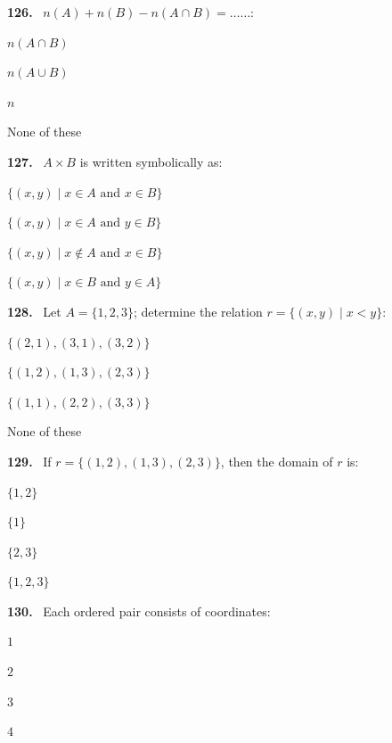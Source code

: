 \documentclass[11pt]{article}
\newenvironment{qenv}[1]{%
  \par\medskip\noindent\textbf{#1.}\ \ignorespaces
}{\par}
\begin{document}
\begin{qenv}{126} $n(A)+n(B)-n(A\cap B) = \ldots\ldots$:
\begin{options} \item $n(A\cap B)$ \item $n(A\cup B)$ \item $n$ \item None of these \end{options} \end{qenv}

\begin{qenv}{127} $A\times B$ is written symbolically as:
\begin{options} \item $\{(x,y)\mid x\in A \text{ and } x\in B\}$ \item $\{(x,y)\mid x\in A \text{ and } y\in B\}$ \item $\{(x,y)\mid x\notin A \text{ and } x\in B\}$ \item $\{(x,y)\mid x\in B \text{ and } y\in A\}$ \end{options} \end{qenv}

\begin{qenv}{128} Let $A=\{1,2,3\}$; determine the relation $r=\{(x,y)\mid x<y\}$:
\begin{options} \item $\{(2,1),(3,1),(3,2)\}$ \item $\{(1,2),(1,3),(2,3)\}$ \item $\{(1,1),(2,2),(3,3)\}$ \item None of these \end{options} \end{qenv}

\begin{qenv}{129} If $r=\{(1,2),(1,3),(2,3)\}$, then the domain of $r$ is:
\begin{options} \item $\{1,2\}$ \item $\{1\}$ \item $\{2,3\}$ \item $\{1,2,3\}$ \end{options} \end{qenv}

\begin{qenv}{130} Each ordered pair consists of \underline{\hspace{2cm}} coordinates:
\begin{options} \item $1$ \item $2$ \item $3$ \item $4$ \end{options} \end{qenv}
\end{document}
